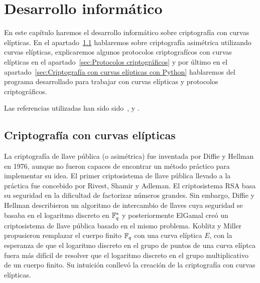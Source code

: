 \chapter{Desarrollo informático}
\label{ch:Desarrollo informático}

En este capítulo haremos el desarrollo informático sobre criptografía con curvas elípticas. En el apartado~\ref{sec:Criptografía con curvas elípticas} hablaremos sobre criptografía asimétrica utilizando curvas elípticas, explicaremos algunos protocolos criptografícos con curvas elípticas en el apartado~\ref{sec:Protocolos criptográficos} y por último en el apartado~\ref{sec:Criptografía con curvas elípticas con Python} hablaremos del programa desarrollado para trabajar con curvas elípticas y protocolos criptográficos.

Las referencias utilizadas han sido sido~\cite{Hankerson:2003}, \cite{Washington:2008} y \cite{Silverman:2009}.

\section{Criptografía con curvas elípticas}
\label{sec:Criptografía con curvas elípticas}

La criptografía de llave pública (o asimétrica) fue inventada por Diffie y Hellman en 1976, aunque no fueron capaces de encontrar un método práctico para implementar su idea. El primer criptosistema de llave pública llevado a la práctica fue concebido por Rivest, Shamir y Adleman. El criptosistema RSA basa su seguridad en la dificultad de factorizar números grandes. Sin embargo, Diffie y Hellman describieron un algoritmo de intercambio de llaves cuya seguridad se basaba en el logaritmo discreto en $\mathbb{F}_q^*$ y posteriormente ElGamal creó un criptosistema de llave pública basado en el mismo problema. Koblitz y Miller propusieron remplazar el cuerpo finito $\mathbb{F}_q$ con una curva elíptica $E$, con la esperanza de que el logaritmo discreto en el grupo de puntos de una curva elíptca fuera más difícil de resolver que el logaritmo discreto en el grupo multiplicativo de un cuerpo finito. Su intuición conllevó la creación de la criptografía con curvas elípticas.



